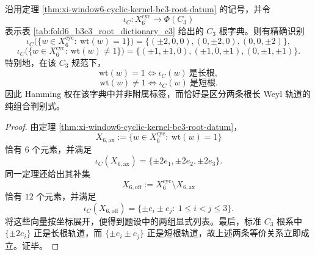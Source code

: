 \begin{theorem}\label{thm:xi-window6-c3-hamming-root-length-split}
沿用定理 \ref{thm:xi-window6-cyclic-kernel-bc3-root-datum} 的记号，并令
\[
\iota_C:X_6^{\mathrm{cyc}}\longrightarrow \Phi(C_3)
\]
表示表 \ref{tab:fold6_b3c3_root_dictionary_c3} 给出的 \(C_3\) 根字典。则有精确识别
\[
\iota_C\bigl(\{w\in X_6^{\mathrm{cyc}}:\ \mathrm{wt}(w)=1\}\bigr)
=
\{(\pm 2,0,0),(0,\pm 2,0),(0,0,\pm 2)\},
\]
\[
\iota_C\bigl(\{w\in X_6^{\mathrm{cyc}}:\ \mathrm{wt}(w)\neq 1\}\bigr)
=
\{(\pm 1,\pm 1,0),(\pm 1,0,\pm 1),(0,\pm 1,\pm 1)\}.
\]
特别地，在该 \(C_3\) 规范下，
\[
\mathrm{wt}(w)=1
\iff
\iota_C(w)\ \text{是长根},
\]
\[
\mathrm{wt}(w)\neq 1
\iff
\iota_C(w)\ \text{是短根}.
\]
因此 Hamming 权在该字典中并非附属标签，而恰好是区分两条根长 Weyl 轨道的纯组合判别式。
\end{theorem}
\begin{proof}
由定理 \ref{thm:xi-window6-cyclic-kernel-bc3-root-datum}，
\[
X_{6,\mathrm{ax}}
:=
\{w\in X_6^{\mathrm{cyc}}:\ \mathrm{wt}(w)=1\}
\]
恰有 \(6\) 个元素，并满足
\[
\iota_C(X_{6,\mathrm{ax}})
=
\{\pm 2e_1,\pm 2e_2,\pm 2e_3\}.
\]
同一定理还给出其补集
\[
X_{6,\mathrm{off}}:=X_6^{\mathrm{cyc}}\setminus X_{6,\mathrm{ax}}
\]
恰有 \(12\) 个元素，并满足
\[
\iota_C(X_{6,\mathrm{off}})
=
\{\pm e_i\pm e_j:\ 1\le i<j\le 3\}.
\]
将这些向量按坐标展开，便得到题设中的两组显式列表。最后，标准 \(C_3\) 根系中 \(\{\pm 2e_i\}\) 正是长根轨道，而 \(\{\pm e_i\pm e_j\}\) 正是短根轨道，故上述两条等价关系立即成立。证毕。
\end{proof}

